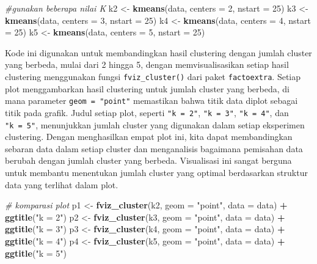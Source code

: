\documentclass[
  oneside]{book}
\newenvironment{Shaded}{\begin{snugshade}}{\end{snugshade}}
\newcommand{\AttributeTok}[1]{\textcolor[rgb]{0.13,0.29,0.53}{#1}}
\newcommand{\CommentTok}[1]{\textcolor[rgb]{0.56,0.35,0.01}{\textit{#1}}}
\newcommand{\DecValTok}[1]{\textcolor[rgb]{0.00,0.00,0.81}{#1}}
\newcommand{\FunctionTok}[1]{\textcolor[rgb]{0.13,0.29,0.53}{\textbf{#1}}}
\newcommand{\NormalTok}[1]{#1}
\newcommand{\OtherTok}[1]{\textcolor[rgb]{0.56,0.35,0.01}{#1}}
\newcommand{\SpecialCharTok}[1]{\textcolor[rgb]{0.81,0.36,0.00}{\textbf{#1}}}
\newcommand{\StringTok}[1]{\textcolor[rgb]{0.31,0.60,0.02}{#1}}
\begin{document}
\begin{Shaded}
\begin{Highlighting}[]
\CommentTok{\#gunakan beberapa nilai K}
\NormalTok{k2 }\OtherTok{\textless{}{-}} \FunctionTok{kmeans}\NormalTok{(data, }\AttributeTok{centers =} \DecValTok{2}\NormalTok{, }\AttributeTok{nstart =} \DecValTok{25}\NormalTok{)}
\NormalTok{k3 }\OtherTok{\textless{}{-}} \FunctionTok{kmeans}\NormalTok{(data, }\AttributeTok{centers =} \DecValTok{3}\NormalTok{, }\AttributeTok{nstart =} \DecValTok{25}\NormalTok{)}
\NormalTok{k4 }\OtherTok{\textless{}{-}} \FunctionTok{kmeans}\NormalTok{(data, }\AttributeTok{centers =} \DecValTok{4}\NormalTok{, }\AttributeTok{nstart =} \DecValTok{25}\NormalTok{)}
\NormalTok{k5 }\OtherTok{\textless{}{-}} \FunctionTok{kmeans}\NormalTok{(data, }\AttributeTok{centers =} \DecValTok{5}\NormalTok{, }\AttributeTok{nstart =} \DecValTok{25}\NormalTok{)}
\end{Highlighting}
\end{Shaded}

Kode ini digunakan untuk membandingkan hasil clustering dengan jumlah cluster yang berbeda, mulai dari 2 hingga 5, dengan memvisualisasikan setiap hasil clustering menggunakan fungsi \texttt{fviz\_cluster()} dari paket \texttt{factoextra}. Setiap plot menggambarkan hasil clustering untuk jumlah cluster yang berbeda, di mana parameter \texttt{geom\ =\ "point"} memastikan bahwa titik data diplot sebagai titik pada grafik. Judul setiap plot, seperti \texttt{"k\ =\ 2"}, \texttt{"k\ =\ 3"}, \texttt{"k\ =\ 4"}, dan \texttt{"k\ =\ 5"}, menunjukkan jumlah cluster yang digunakan dalam setiap eksperimen clustering. Dengan menghasilkan empat plot ini, kita dapat membandingkan sebaran data dalam setiap cluster dan menganalisis bagaimana pemisahan data berubah dengan jumlah cluster yang berbeda. Visualisasi ini sangat berguna untuk membantu menentukan jumlah cluster yang optimal berdasarkan struktur data yang terlihat dalam plot.

\begin{Shaded}
\begin{Highlighting}[]
\CommentTok{\# komparasi plot}
\NormalTok{p1 }\OtherTok{\textless{}{-}} \FunctionTok{fviz\_cluster}\NormalTok{(k2, }\AttributeTok{geom =} \StringTok{"point"}\NormalTok{, }\AttributeTok{data =}\NormalTok{ data) }\SpecialCharTok{+} \FunctionTok{ggtitle}\NormalTok{(}\StringTok{"k = 2"}\NormalTok{)}
\NormalTok{p2 }\OtherTok{\textless{}{-}} \FunctionTok{fviz\_cluster}\NormalTok{(k3, }\AttributeTok{geom =} \StringTok{"point"}\NormalTok{,  }\AttributeTok{data =}\NormalTok{ data) }\SpecialCharTok{+} \FunctionTok{ggtitle}\NormalTok{(}\StringTok{"k = 3"}\NormalTok{)}
\NormalTok{p3 }\OtherTok{\textless{}{-}} \FunctionTok{fviz\_cluster}\NormalTok{(k4, }\AttributeTok{geom =} \StringTok{"point"}\NormalTok{,  }\AttributeTok{data =}\NormalTok{ data) }\SpecialCharTok{+} \FunctionTok{ggtitle}\NormalTok{(}\StringTok{"k = 4"}\NormalTok{)}
\NormalTok{p4 }\OtherTok{\textless{}{-}} \FunctionTok{fviz\_cluster}\NormalTok{(k5, }\AttributeTok{geom =} \StringTok{"point"}\NormalTok{,  }\AttributeTok{data =}\NormalTok{ data) }\SpecialCharTok{+} \FunctionTok{ggtitle}\NormalTok{(}\StringTok{"k = 5"}\NormalTok{)}
\end{Highlighting}
\end{Shaded}
\end{document}
